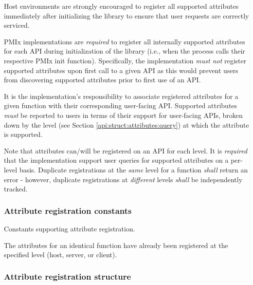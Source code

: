 \advicermstart
Host environments are strongly encouraged to register all supported attributes immediately after initializing the library to ensure that user requests are correctly serviced.
\advicermend

\adviceimplstart
\ac{PMIx} implementations are \emph{required} to register all internally supported attributes for each \ac{API} during initialization of the library (i.e., when the process calls their respective \ac{PMIx} init function). Specifically, the implementation \emph{must not} register supported attributes upon first call to a given \ac{API} as this would prevent users from discovering supported attributes prior to first use of an \ac{API}.

It is the implementation's responsibility to associate registered attributes for a given  function with their corresponding user-facing \ac{API}. Supported attributes \emph{must} be reported to users in terms of their support for user-facing \acp{API}, broken down by the level (see Section \ref{api:struct:attributes:query}) at which the attribute is supported.

Note that attributes can/will be registered on an \ac{API} for each level. It is \emph{required} that the implementation support user queries for supported attributes on a per-level basis. Duplicate registrations at the \emph{same} level for a function \emph{shall} return an error - however, duplicate registrations at \emph{different} levels \emph{shall} be independently tracked.
\adviceimplend


\subsubsection{Attribute registration constants}

Constants supporting attribute registration.

\begin{constantdesc}
%
The attributes for an identical function have already been registered at the specified level (host, server, or client).
%
\end{constantdesc}

\subsubsection{Attribute registration structure}


